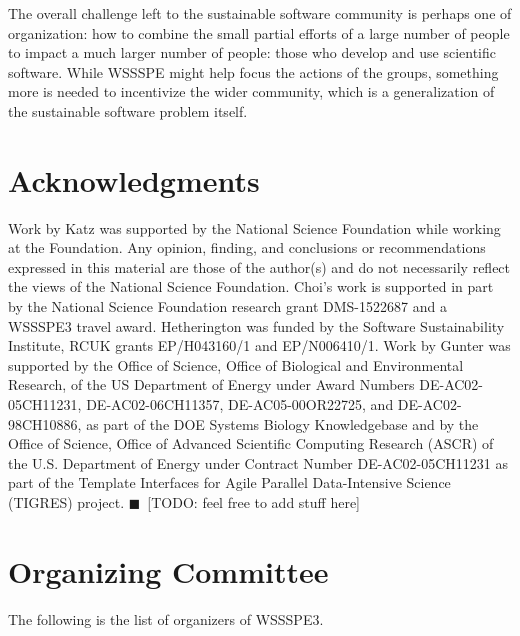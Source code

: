 \documentclass[11pt, oneside]{amsart}
\newcommand{\todo}[1]{{\color{blue}$\blacksquare$~\textsf{[TODO: #1]}}}
\begin{document}
The overall challenge
left to the sustainable software community is perhaps one of organization: how
to combine the small partial efforts of a large number of people to impact a much
larger number of people: those who develop and use scientific software.  While
WSSSPE might help focus the actions of the groups, something more is needed
to incentivize the wider community, which is a generalization of the sustainable
software problem itself.





\section*{Acknowledgments} \label{sec:acks}

Work by Katz was supported by the National Science Foundation while working at
the Foundation. Any opinion, finding, and conclusions or recommendations
expressed in this material are those of the author(s) and do not necessarily
reflect the views of the National Science Foundation. Choi's work is supported
in part by the National Science Foundation research grant DMS-1522687 and
a WSSSPE3 travel award. Hetherington was funded by
the Software Sustainability Institute, RCUK grants EP/H043160/1 and EP/N006410/1.
%
Work by Gunter was supported by the Office of Science, Office of Biological and 
Environmental Research, of the US Department of Energy under Award Numbers 
DE-AC02-05CH11231, DE-AC02-06CH11357, DE-AC05-00OR22725, and DE-AC02-98CH10886, 
as part of the DOE Systems Biology Knowledgebase and by the Office of Science, 
Office of Advanced Scientific Computing Research (ASCR) of the U.S. Department 
of Energy under Contract Number DE-AC02-05CH11231 as part of the Template
Interfaces for Agile Parallel Data-Intensive Science (TIGRES) project.
%
\todo{feel free to add stuff here}


\appendix
\section{Organizing Committee}  \label{sec:orgcom}
The following is the list of organizers of WSSSPE3.

{\scriptsize
\begin{longtable}{lll}

\end{longtable}
}
 
\end{document}
